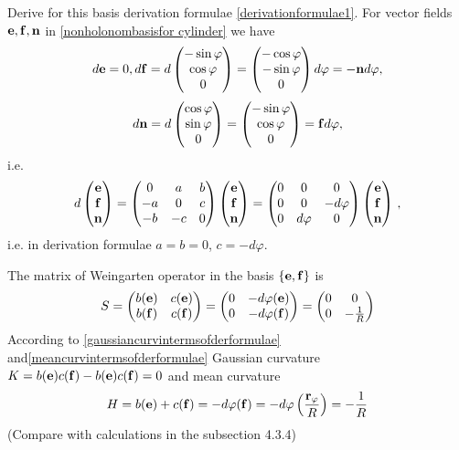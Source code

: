 \documentclass[12pt]{article}
\theoremstyle{theorem}
\numberwithin{equation}{section}
\begin{document}
{   Derive for this basis derivation formulae \eqref{derivationformulae1}. For vector fields ${\bf e},{\bf f},{\bf n}$
   in \eqref{nonholonombasisfor cylinder} we have
                   $$
             d{\bf e}=0, d{\bf f}=d\begin{pmatrix}
        -\sin\varphi\cr
        \cos\varphi\cr
          0\cr
   \end{pmatrix}=\begin{pmatrix}
        -\cos\varphi\cr
        -\sin\varphi\cr
          0\cr
   \end{pmatrix}d\varphi=-{\bf n} d\varphi,
          $$
          $$
   d{\bf n}=d\begin{pmatrix}
        \cos \varphi\cr
        \sin\varphi\cr
        0\cr
   \end{pmatrix}=
   \begin{pmatrix}
        -\sin\varphi \cr
        \cos\varphi\cr
        0\cr
   \end{pmatrix}={\bf f} d\varphi,
                   $$
   i.e.
   \begin{equation}\label{derivationformulaefor cylinder}
                    d\begin{pmatrix}
                    {\bf e}\cr{\bf f}\cr{\bf n}\cr
                    \end{pmatrix}=
                    \begin{pmatrix}
                    0&a&b\cr -a&0&c\cr -b&-c&0\cr
                    \end{pmatrix}
                 \begin{pmatrix}
                    {\bf e}\cr{\bf f}\cr{\bf n}\cr
                    \end{pmatrix}=
                     \begin{pmatrix}
                    0&0&0\cr 0&0&-d\varphi\cr 0&d\varphi&0\cr
                    \end{pmatrix}
                 \begin{pmatrix}
                    {\bf e}\cr{\bf f}\cr{\bf n}\cr
                    \end{pmatrix}\,,
                   \end{equation}
  i.e. in derivation formulae $a=b=0$, $c=-d\varphi$.

  The matrix of Weingarten operator in the basis  $\{{\bf e},{\bf f}\}$ is
             $$
     S=
\begin{pmatrix}
b({\bf e})  &c({\bf e})\cr
b({\bf f})  &c({\bf f})\cr
\end{pmatrix}=
\begin{pmatrix}
0  &-d\varphi({\bf e})\cr
0  &-d\varphi({\bf f})\cr
\end{pmatrix}=
\begin{pmatrix}
0  &0\cr
0  &-{1\over R}\cr
\end{pmatrix}
       $$
    According to  \eqref{gaussiancurvintermsofderformulae}  and\eqref{meancurvintermsofderformulae}
                Gaussian curvature $K=b({\bf e})c({\bf f})-b({\bf e})c({\bf f})=0$ and
                mean curvature
                 $$
    H=b({\bf e})+c({\bf f})=-d\varphi({\bf f})=-d\varphi\left({{\bf r}_\varphi\over R}\right)=-{1\over R}
                 $$
  (Compare with calculations in the subsection 4.3.4)


}
\end{document}
